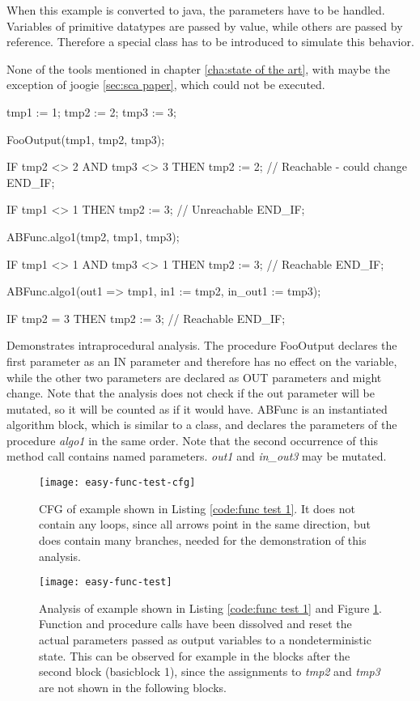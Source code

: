 When this example is converted to java, the parameters have to be handled. Variables of primitive datatypes are passed by value, while others are passed by reference. Therefore a special class has to be introduced to simulate this behavior. 

None of the tools mentioned in chapter \ref{cha:state of the art}, with maybe the exception of joogie \ref{sec:sca paper}, which could not be executed.


\begin{program}[h!]
	\begin{GenericCode}
tmp1 := 1;
tmp2 := 2;
tmp3 := 3;

FooOutput(tmp1, tmp2, tmp3);

IF tmp2 <> 2 AND tmp3 <> 3 THEN
	tmp2 := 2; // Reachable - could change
END_IF;

IF tmp1 <> 1 THEN
	tmp2 := 3; // Unreachable
END_IF;

ABFunc.algo1(tmp2, tmp1, tmp3);

IF tmp1 <> 1 AND tmp3 <> 1 THEN
	tmp2 := 3; // Reachable
END_IF;

ABFunc.algo1(out1 => tmp1, in1 := tmp2, in_out1 := tmp3);

IF tmp2 = 3 THEN
	tmp2 := 3; // Reachable
END_IF;	\end{GenericCode}
	\centering
	\caption{Demonstrates intraprocedural analysis. The procedure  FooOutput declares the first parameter as an IN parameter and therefore has no effect on the variable, while the other two parameters are declared as OUT parameters and might change. Note that the analysis does not check if the out parameter will be mutated, so it will be counted as if it would have. ABFunc is an instantiated algorithm block, which is similar to a class, and declares the parameters of the procedure \emph{algo1} in the same order. Note that the second occurrence of this method call contains named parameters. \emph{out1} and \emph{in\_out3} may be mutated.}
	\label{code:func test 1}
\end{program}
\begin{figure}[h!]
	\centering
	\texttt{[image: easy-func-test-cfg]}
	\caption{CFG of example shown in Listing \ref{code:func test 1}. It does not contain any loops, since all arrows point in the same direction, but does contain many branches, needed for the demonstration of this analysis.}
	\label{fig:func test 1 cfg}
\end{figure}
\begin{figure}[h!]
	\centering
	\texttt{[image: easy-func-test]}
	\caption{Analysis of example shown in Listing \ref{code:func test 1} and Figure \ref{fig:func test 1 cfg}. Function and procedure calls have been dissolved and reset the actual parameters passed as output variables to a nondeterministic state. This can be observed for example in the blocks after the second block (basicblock 1), since the assignments to \emph{tmp2} and \emph{tmp3} are not shown in the following blocks.}
	\label{fig:func test 1}
\end{figure}

